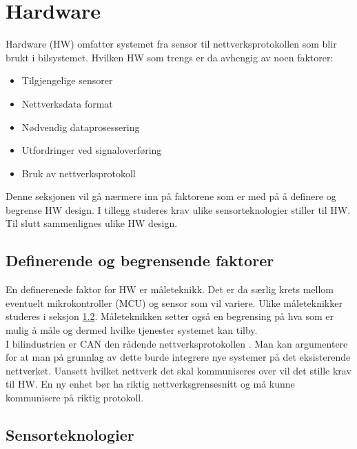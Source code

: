 \section{Hardware}

Hardware (HW) omfatter systemet fra sensor til nettverksprotokollen som blir brukt i
bilsystemet. Hvilken HW
som trengs er da avhengig av noen faktorer:
\begin{itemize}
\item Tilgjengelige sensorer
\item Nettverksdata format
\item Nødvendig dataprosessering
\item Utfordringer ved signaloverføring
\item Bruk av nettverksprotokoll
\end{itemize}

Denne seksjonen vil gå nærmere inn på faktorene som er med på å definere og begrense HW design. I tillegg
studeres krav ulike sensorteknologier stiller til HW. Til slutt sammenlignes ulike HW design.


\subsection{Definerende og begrensende faktorer}

En definerenede faktor for HW er måleteknikk. Det er da særlig krets
mellom eventuelt mikrokontroller (MCU) og sensor som vil variere. Ulike måleteknikker studeres
i seksjon \ref{subsec:sensorteknologier}. Måleteknikken setter også en begrensing på hva som er
mulig å måle og dermed hvilke tjenester systemet kan tilby. \\

I bilindustrien er CAN den rådende nettverksprotokollen \cite{canbus}. Man
kan argumentere for at man på grunnlag av dette burde integrere nye systemer på
det eksisterende nettverket. Uansett hvilket nettverk det skal kommuniseres over
vil det stille krav til HW. En ny enhet bør ha riktig nettverksgrensesnitt
og må kunne kommunisere på riktig protokoll. \\

\subsection{Sensorteknologier}
\label{subsec:sensorteknologier}

